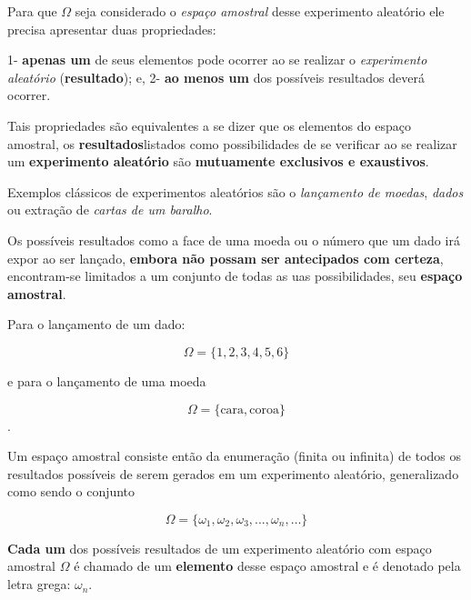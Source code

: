 \documentclass[
]{book}
\begin{document}
\hfill\break

Para que \(\Omega\) seja considerado o \emph{espaço amostral} desse experimento aleatório ele precisa apresentar duas propriedades:

\hfill\break

1- \textbf{apenas um} de seus elementos pode ocorrer ao se realizar o \emph{experimento aleatório} (\textbf{resultado}); e,
2- \textbf{ao menos um} dos possíveis resultados deverá ocorrer.

\hfill\break

Tais propriedades são equivalentes a se dizer que os elementos do espaço amostral, os \textbf{resultados}listados como possibilidades de se verificar ao se realizar um \textbf{experimento aleatório} são \textbf{mutuamente exclusivos e exaustivos}.

\hfill\break

Exemplos clássicos de experimentos aleatórios são o \emph{lançamento de moedas}, \emph{dados} ou extração de \emph{cartas de um baralho}.

\hfill\break

Os possíveis resultados como a face de uma moeda ou o número que um dado irá expor ao ser lançado, \textbf{embora não possam ser antecipados com certeza}, encontram-se limitados a um conjunto de todas as uas possibilidades, seu \textbf{espaço amostral}.

\hfill\break

Para o lançamento de um dado:

\hfill\break

\[
\Omega = \{ 1,2,3,4,5,6\}
\]

\hfill\break

e para o lançamento de uma moeda

\hfill\break

\[
\Omega=\{\text{cara}, \text{coroa}\}
\].

\hfill\break

Um espaço amostral consiste então da enumeração (finita ou infinita) de todos os resultados possíveis de serem gerados em um experimento aleatório, generalizado como sendo o conjunto

\hfill\break

\[
\Omega = \{\omega_{1}, \omega_{2}, \omega_{3}, ..., \omega_{n}, \dots \}
\]

\hfill\break

\textbf{Cada um} dos possíveis resultados de um experimento aleatório com espaço amostral \(\Omega\) é chamado de um \textbf{elemento} desse espaço amostral e é denotado pela letra grega: \(\omega_{n}\).
\end{document}
